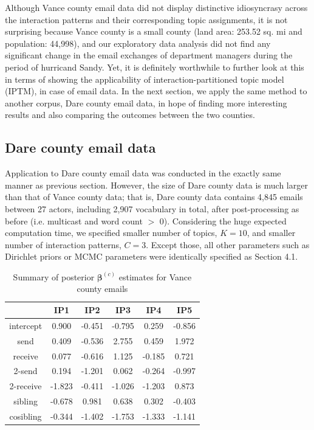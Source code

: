 \documentclass[a4paper]{article}
\begin{document}
\normalsize
\newline
Although Vance county email data did not display distinctive idiosyncrasy across the interaction patterns and their corresponding topic assignments, it is not surprising because Vance county is a small county (land area: 253.52 sq. mi and population: 44,998), and our exploratory data analysis did not find any significant change in the email exchanges of department managers during the period of hurricand Sandy. Yet, it is definitely worthwhile to further look at this in terms of showing the applicability of interaction-partitioned topic model (IPTM), in case of email data. In the next section, we apply the same method to another corpus, Dare county email data, in hope of finding more interesting results and also comparing the outcomes between the two counties.
\clearpage
\subsection{Dare county email data}
Application to Dare county email data was conducted in the exactly same manner as previous section. However, the size of Dare county data is much larger than that of Vance county data; that is, Dare county data contains 4,845 emails between 27 actors, including 2,907 vocabulary in total, after post-processing as before (i.e. multicast and word count $>$ 0).   Considering the huge expected computation time, we specified smaller number of topics, $K=10$, and smaller number of interaction patterns, $C=3$. Except those, all other parameters such as Dirichlet priors or MCMC parameters were identically specified as Section 4.1.
\footnotesize
\begin{table}[ht]
	\centering
	\begin{tabular}{|c|c|c|c|c|c|} 
		\hline
		& \textbf{IP1} & \textbf{IP2} &\textbf{IP3}&\textbf{IP4}&\textbf{IP5}\\
		\hline
		intercept &0.900 & -0.451& -0.795& 0.259&-0.856
		\\
		send&  0.409&-0.536& 2.755&  0.459& 1.972\\
		receive& 0.077&-0.616& 1.125&-0.185&0.721\\
		2-send&0.194&-1.201&0.062&-0.264&-0.997\\
		2-receive&-1.823&-0.411& -1.026& -1.203&0.873\\
		sibling&-0.678&0.981&  0.638&0.302&-0.403\\
		cosibling&-0.344&-1.402&-1.753& -1.333& -1.141\\
		\hline
	\end{tabular}
	\caption {Summary of posterior $\boldsymbol{\beta}^{(c)}$ estimates for Vance county emails}
	\label{table:AlexanderMCMC}
\end{table}
\end{document}
